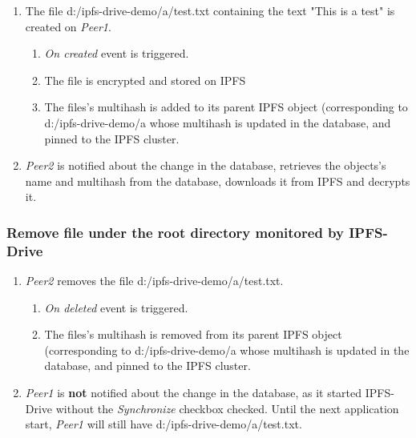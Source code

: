 \documentclass[12pt]{report}
\begin{document}
\begin{enumerate}[resume]

\item The file {\ttfamily d:/ipfs-drive-demo/a/test.txt} containing the text "This is a test" is created on \textit{Peer1}.

	\begin{enumerate}
	\item \textit{On created} event is triggered.
	\item The file is encrypted and stored on IPFS
	\item  The files's multihash is added to its parent IPFS object (corresponding to  {\ttfamily d:/ipfs-drive-demo/a}  whose multihash is updated in the database, and pinned to the IPFS cluster.
	\end{enumerate}	

\item \textit{Peer2} is notified about the change in the database, retrieves the objects's name and multihash from the database, downloads it from IPFS and decrypts it.

\end{enumerate}

\subsubsection{Remove file under the root directory monitored by IPFS-Drive}

\begin{enumerate}[resume]

\item \textit{Peer2} removes the file {\ttfamily d:/ipfs-drive-demo/a/test.txt}.

	\begin{enumerate}
	\item \textit{On deleted} event is triggered.
	\item The files's multihash is removed from its parent IPFS object (corresponding to  {\ttfamily d:/ipfs-drive-demo/a}  whose multihash is updated in the database, and pinned to the IPFS cluster.
	\end{enumerate}

\item \textit{Peer1} is \textbf{not} notified about the change in the database, as it started IPFS-Drive without the \textit{Synchronize} checkbox checked. Until the next application start, \textit{Peer1} will still have {\ttfamily d:/ipfs-drive-demo/a/test.txt}.

\end{enumerate}
\end{document}
